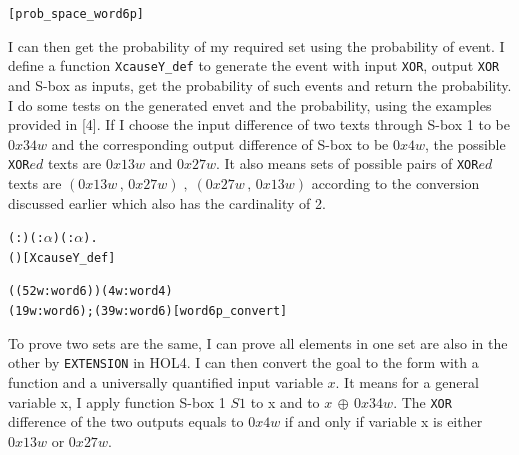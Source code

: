 \documentclass{article}
\begin{document}
\begin{alltt}
  \HOLTokenTurnstile{}  \hfill{[prob_space_word6p]}
\end{alltt}

I can then get the probability of my required set using the probability of event. I define a
function \verb|XcauseY_def| to generate the event with input \verb|XOR|, output \verb|XOR| and S-box as inputs, get the
probability of such events and return the probability. I do some tests on the generated envet
and the probability, using the examples provided in [4]. If I choose the input difference of two texts through
S-box 1 to be $0x34w$ and the corresponding output difference of S-box to be $0x4w$, the possible \verb|XOR|$ed$ texts are
$0x13w$ and $0x27w$. It also means sets of possible pairs of \verb|XOR|$ed$ texts are
${(0x13w\,,\, 0x27w)\;,\;(0x27w\,,\,0x13w)}$
according to the conversion discussed earlier which also has the cardinality of 2.

\begin{alltt}
  \HOLTokenTurnstile{} \HOLSymConst{\HOLTokenForall{}}( :) ( :\ensuremath{\alpha} ) ( : \HOLTokenMap{} \ensuremath{\alpha} ).
         \HOLSymConst{=}   \HOLTokenLeftbrace{} \HOLTokenBar{}   \HOLSymConst{\HOLTokenEor{}}  ( \HOLSymConst{\HOLTokenEor{}} ) \HOLSymConst{=} \HOLTokenRightbrace{}\hfill{[XcauseY_def]}
\end{alltt}

\begin{alltt}
  \HOLTokenTurnstile{} \HOLTokenLeftbrace{} \HOLTokenBar{}   \HOLSymConst{\HOLTokenEor{}}  ( \HOLSymConst{\HOLTokenEor{}} (52w :word6)) \HOLSymConst{=} (4w :word4)\HOLTokenRightbrace{} \HOLSymConst{=}
   \HOLTokenLeftbrace{}(19w :word6); (39w :word6)\HOLTokenRightbrace{}\hfill{[word6p_convert]}
\end{alltt}

To prove two sets are the same, I can prove all elements in one set are also in the other by \verb|EXTENSION|
in HOL4. I can then convert the goal to the form with a function and a universally quantified input
variable $x$. It means for a general variable x, I apply function S-box 1 $S1$ to x and to $x\,\oplus\, 0x34w$.
The \verb|XOR| difference of the two outputs equals to $0x4w$ if and only if variable x is either $0x13w$ or $0x27w$.
\end{document}
